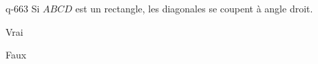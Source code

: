 \begin{truefalse}{q-663}
Si $ABCD$ est un rectangle, les diagonales se coupent à angle droit.
\item Vrai
\item* Faux
\end{truefalse}

